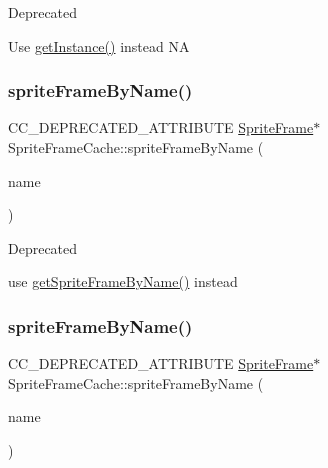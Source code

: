 \begin{DoxyRefDesc}{Deprecated}
\item[\hyperlink{deprecated__deprecated000276}{Deprecated}]Use \hyperlink{classSpriteFrameCache_afc6f3a882c36cfd48e4b450a6fcbf535}{get\+Instance()} instead  NA \end{DoxyRefDesc}
\mbox{\label{classSpriteFrameCache_a8118bf96fc4d957e3ed68f9990fb2d74}} 
\subsubsection{\texorpdfstring{sprite\+Frame\+By\+Name()}{spriteFrameByName()}\hspace{0.1cm}{\footnotesize\ttfamily [1/2]}}
{\footnotesize\ttfamily C\+C\+\_\+\+D\+E\+P\+R\+E\+C\+A\+T\+E\+D\+\_\+\+A\+T\+T\+R\+I\+B\+U\+TE \hyperlink{classSpriteFrame}{Sprite\+Frame}$\ast$ Sprite\+Frame\+Cache\+::sprite\+Frame\+By\+Name (\begin{DoxyParamCaption}\item[{const std\+::string \&}]{name }\end{DoxyParamCaption})\hspace{0.3cm}{\ttfamily [inline]}}

\begin{DoxyRefDesc}{Deprecated}
\item[\hyperlink{deprecated__deprecated000046}{Deprecated}]use \hyperlink{classSpriteFrameCache_a36ba54daea85ff2c8a3dd6f3525eb17e}{get\+Sprite\+Frame\+By\+Name()} instead \end{DoxyRefDesc}
\mbox{\label{classSpriteFrameCache_a8118bf96fc4d957e3ed68f9990fb2d74}} 
\subsubsection{\texorpdfstring{sprite\+Frame\+By\+Name()}{spriteFrameByName()}\hspace{0.1cm}{\footnotesize\ttfamily [2/2]}}
{\footnotesize\ttfamily C\+C\+\_\+\+D\+E\+P\+R\+E\+C\+A\+T\+E\+D\+\_\+\+A\+T\+T\+R\+I\+B\+U\+TE \hyperlink{classSpriteFrame}{Sprite\+Frame}$\ast$ Sprite\+Frame\+Cache\+::sprite\+Frame\+By\+Name (\begin{DoxyParamCaption}\item[{const std\+::string \&}]{name }\end{DoxyParamCaption})\hspace{0.3cm}{\ttfamily [inline]}}

